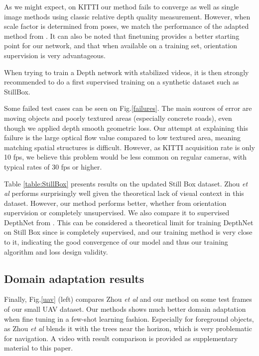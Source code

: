 \documentclass[runningheads]{llncs}
\def\etal{\emph{et al}\:}
\begin{document}
As we might expect, on KITTI our method fails to converge as well as single image methods using classic relative depth quality measurement. However, when scale factor is determined from poses, we match the performance of the adapted method from \cite{zhou2017unsupervised}. It can also be noted that finetuning provides a better starting point for our network, and that when available on a training set, orientation supervision is very advantageous.

When trying to train a Depth network with stabilized videos, it is then strongly recommended to do a first supervised training on a synthetic dataset such as StillBox.

Some failed test cases can be seen on Fig.\ref{failures}. The main sources of error are moving objects and poorly textured
areas (especially concrete roads), even though we applied depth smooth geometric loss. Our attempt at explaining this failure is the large optical flow value compared to low textured area, meaning matching spatial structures is difficult. However, as KITTI acquisition rate is only 10 fps, we believe this problem would be less common on regular cameras, with typical rates of 30 fps or higher.


Table \ref{table:StillBox} presents results on the updated Still Box dataset. Zhou \etal \cite{zhou2017unsupervised} performs surprisingly well given the theoretical lack of visual context in this dataset. However, our method performs better, whether from orientation supervision or completely unsupervised. We also compare it to supervised DepthNet from \cite{isprs-annals-IV-2-W3-67-2017}. This can be considered a theoretical limit for training DepthNet on Still Box since 
\cite{isprs-annals-IV-2-W3-67-2017}
is completely supervised, and our training method is very close to it, indicating the good convergence of our model and thus our training algorithm and loss design validity.

\subsection{Domain adaptation results}
Finally, Fig.\ref{uav} (left) compares Zhou \etal \cite{zhou2017unsupervised} and our method on some test frames of our small UAV dataset. Our methods shows much better domain adaptation when fine tuning in a few-shot learning fashion. Especially for foreground objects, as Zhou \etal \cite{zhou2017unsupervised} blends it with the trees near the horizon, which is very problematic for navigation. A video with result comparison is 
provided as supplementary material to this paper.
\end{document}
